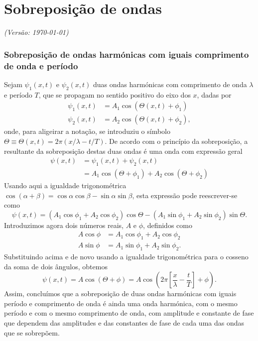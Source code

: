 \chapter{Sobreposição de ondas}
\textsl{{\sffamily(Versão: \today)}}

\subsection{Sobreposição de ondas harmónicas com iguais comprimento de onda e
período}
\label{sec:sobrpos}
Sejam $\psi_1(x,t)$ e $\psi_2(x,t)$ duas ondas harmónicas com comprimento de
onda $\lambda$ e período $T$, que se propagam no sentido positivo do eixo dos
$x$, dadas por
\begin{align*}
\psi_1(x,t)&=A_1\cos\left(\Theta(x,t)+\phi_1\right)\\
\psi_2(x,t)&=A_2\cos\left(\Theta(x,t)+\phi_2\right),
\end{align*}
onde, para aligeirar a notação, se introduziu o símbolo
$\Theta\equiv\Theta(x,t)=2\pi(x/\lambda-t/T)$. De acordo com o princípio da
sobreposição, a resultante da sobreposição destas duas ondas é uma onda com
expressão geral
\begin{align*}
\psi(x,t)&=\psi_1(x,t)+\psi_2(x,t)\\
&=A_1\cos(\Theta+\phi_1)+A_2\cos(\Theta+\phi_2)
\end{align*}
Usando aqui a igualdade trigonométrica
$\cos(\alpha+\beta)=\cos\alpha\cos\beta-\sin\alpha\sin\beta$, esta expressão
pode reescrever-se como
\begin{equation*}
\psi(x,t)=(A_1\cos\phi_1+A_2\cos\phi_2)\cos\Theta-
(A_1\sin\phi_1+A_2\sin\phi_2)\sin\Theta.
\end{equation*}
Introduzimos agora dois números reais, $A$ e $\phi$, definidos como
\begin{align*}
A\cos\phi&=A_1\cos\phi_1+A_2\cos\phi_2\\
A\sin\phi&=A_1\sin\phi_1+A_2\sin\phi_2.
\end{align*}
Substituindo acima e de novo usando a igualdade trigonométrica para o cosseno da
soma de dois ângulos, obtemos
\begin{equation*}
\psi(x,t)=A\cos\left(\Theta+\phi\right)=
A\cos\left(2\pi\left[\frac{x}{\lambda}-\frac{t}{T}\right]+\phi\right).
\end{equation*}
Assim, concluímos que a sobreposição de duas ondas harmónicas com iguais período
e comprimento de onda é ainda uma onda harmónica, com o mesmo período e com o
mesmo comprimento de onda, com amplitude e constante de fase que dependem das amplitudes
e das constantes de fase de cada uma das ondas que se sobrepõem.

